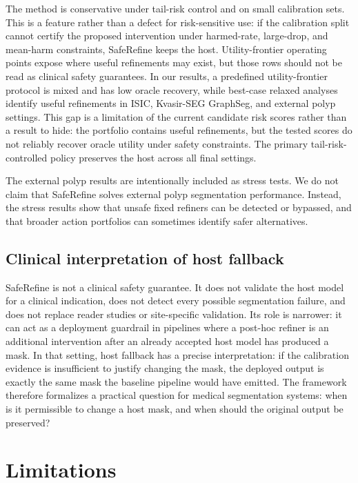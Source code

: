 \documentclass[preprint,12pt]{elsarticle}
\begin{document}
The method is conservative under tail-risk control and on small calibration
sets. This is a feature rather than a defect for risk-sensitive use: if the
calibration split cannot certify the proposed intervention under harmed-rate,
large-drop, and mean-harm constraints, SafeRefine keeps the host.
Utility-frontier operating points expose where useful refinements may exist,
but those rows should not be read as clinical safety guarantees. In our
results, a predefined utility-frontier protocol is mixed and has low oracle
recovery, while best-case relaxed analyses identify useful refinements in ISIC,
Kvasir-SEG GraphSeg, and external polyp settings. This gap is a limitation of
the current candidate risk scores rather than a result to hide: the portfolio
contains useful refinements, but the tested scores do not reliably recover
oracle utility under safety constraints. The primary tail-risk-controlled
policy preserves the host across all final settings.

The external polyp results are intentionally included as stress tests. We do not
claim that SafeRefine solves external polyp segmentation performance. Instead,
the stress results show that unsafe fixed refiners can be detected or bypassed,
and that broader action portfolios can sometimes identify safer alternatives.

\subsection{Clinical interpretation of host fallback}

SafeRefine is not a clinical safety guarantee. It does not validate the host
model for a clinical indication, does not detect every possible segmentation
failure, and does not replace reader studies or site-specific validation. Its
role is narrower: it can act as a deployment guardrail in pipelines where a
post-hoc refiner is an additional intervention after an already accepted host
model has produced a mask. In that setting, host fallback has a precise
interpretation: if the calibration evidence is insufficient to justify changing
the mask, the deployed output is exactly the same mask the baseline pipeline
would have emitted. The framework therefore formalizes a practical question for
medical segmentation systems: when is it permissible to change a host mask, and
when should the original output be preserved?

\section{Limitations}
\end{document}
